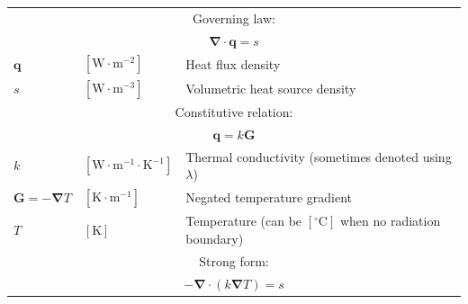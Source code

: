 \documentclass[letterpaper]{article}
\newcommand{\vect}[1]{\mathbf#1}
\newcommand{\nab}{\vect{\nabla}}
\begin{document}
\begin{table}[h!]
\centering
\begin{tabular}{lll}
\hline
\multicolumn{3}{c}{Governing law:} \\
\multicolumn{3}{c}{$\nab\cdot\vect{q}=s$}\\
$\vect{q}$ & $[\text{W}\cdot \text{m}^{-2}]$ & Heat flux density\\
$s$ & $[\text{W}\cdot \text{m}^{-3}]$ & Volumetric heat source density\\
\hline

\multicolumn{3}{c}{Constitutive relation:} \\
\multicolumn{3}{c}{ $\vect{q}=k\vect{G}$}\\
$k$ & $[\text{W}\cdot \text{m}^{-1} \cdot \text{K}^{-1}]$ & Thermal conductivity (sometimes denoted using $\lambda$)\\ %
$\vect{G}=-\nab T$ & $[\text{K}\cdot \text{m}^{-1}]$ & Negated temperature gradient\\
$T$ & $[\text{K}]$ & Temperature (can be $[^\circ\text{C}]$ when no radiation boundary)\\
\hline

\multicolumn{3}{c}{Strong form:} \\
\multicolumn{3}{c}{$-\nab\cdot\left(k\nab T\right)=s$}\\
\hline


\end{tabular}
\end{table}
\end{document}
